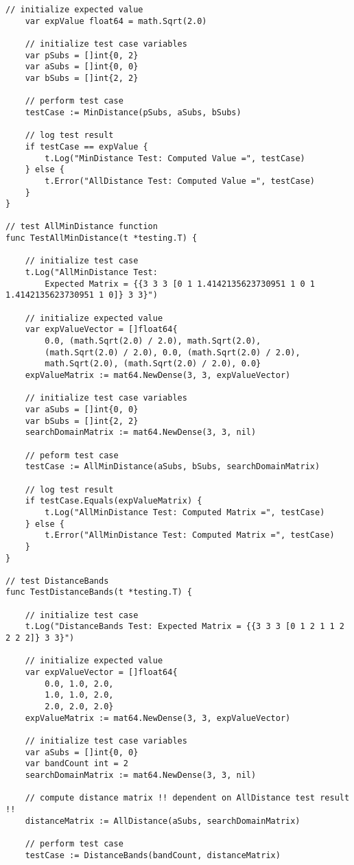 \begin{lstlisting}[basicstyle=\tiny]
	// initialize expected value
	var expValue float64 = math.Sqrt(2.0)

	// initialize test case variables
	var pSubs = []int{0, 2}
	var aSubs = []int{0, 0}
	var bSubs = []int{2, 2}

	// perform test case
	testCase := MinDistance(pSubs, aSubs, bSubs)

	// log test result
	if testCase == expValue {
		t.Log("MinDistance Test: Computed Value =", testCase)
	} else {
		t.Error("AllDistance Test: Computed Value =", testCase)
	}
}

// test AllMinDistance function
func TestAllMinDistance(t *testing.T) {

	// initialize test case
	t.Log("AllMinDistance Test: 
	    Expected Matrix = {{3 3 3 [0 1 1.4142135623730951 1 0 1 1.4142135623730951 1 0]} 3 3}")

	// initialize expected value
	var expValueVector = []float64{
		0.0, (math.Sqrt(2.0) / 2.0), math.Sqrt(2.0),
		(math.Sqrt(2.0) / 2.0), 0.0, (math.Sqrt(2.0) / 2.0),
		math.Sqrt(2.0), (math.Sqrt(2.0) / 2.0), 0.0}
	expValueMatrix := mat64.NewDense(3, 3, expValueVector)

	// initialize test case variables
	var aSubs = []int{0, 0}
	var bSubs = []int{2, 2}
	searchDomainMatrix := mat64.NewDense(3, 3, nil)

	// peform test case
	testCase := AllMinDistance(aSubs, bSubs, searchDomainMatrix)

	// log test result
	if testCase.Equals(expValueMatrix) {
		t.Log("AllMinDistance Test: Computed Matrix =", testCase)
	} else {
		t.Error("AllMinDistance Test: Computed Matrix =", testCase)
	}
}

// test DistanceBands
func TestDistanceBands(t *testing.T) {

	// initialize test case
	t.Log("DistanceBands Test: Expected Matrix = {{3 3 3 [0 1 2 1 1 2 2 2 2]} 3 3}")

	// initialize expected value
	var expValueVector = []float64{
		0.0, 1.0, 2.0,
		1.0, 1.0, 2.0,
		2.0, 2.0, 2.0}
	expValueMatrix := mat64.NewDense(3, 3, expValueVector)

	// initialize test case variables
	var aSubs = []int{0, 0}
	var bandCount int = 2
	searchDomainMatrix := mat64.NewDense(3, 3, nil)

	// compute distance matrix !! dependent on AllDistance test result !!
	distanceMatrix := AllDistance(aSubs, searchDomainMatrix)

	// perform test case
	testCase := DistanceBands(bandCount, distanceMatrix)


\end{lstlisting}
